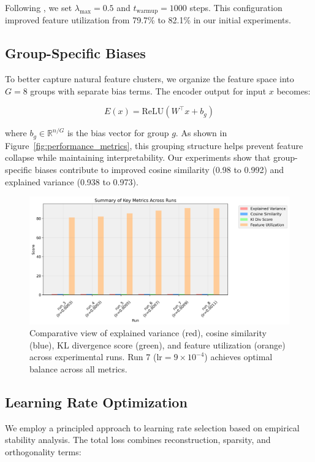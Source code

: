 \documentclass{article} %
\begin{document}
Following \cite{rajamanoharanJumpingAheadImproving2024}, we set $\lambda_{\text{max}}=0.5$ and $t_{\text{warmup}}=1000$ steps. This configuration improved feature utilization from 79.7\% to 82.1\% in our initial experiments.

\subsection{Group-Specific Biases}
To better capture natural feature clusters, we organize the feature space into $G=8$ groups with separate bias terms. The encoder output for input $x$ becomes:

\begin{equation}
    E(x) = \text{ReLU}(W^{\top}x + b_g)
\end{equation}

where $b_g \in \mathbb{R}^{n/G}$ is the bias vector for group $g$. As shown in Figure~\ref{fig:performance_metrics}, this grouping structure helps prevent feature collapse while maintaining interpretability. Our experiments show that group-specific biases contribute to improved cosine similarity (0.98 to 0.992) and explained variance (0.938 to 0.973).

\begin{figure}[t]
    \centering
    \includegraphics[width=\textwidth]{sae_metrics_summary.png}
    \caption{Comparative view of explained variance (red), cosine similarity (blue), KL divergence score (green), and feature utilization (orange) across experimental runs. Run 7 ($\text{lr}=9 \times 10^{-4}$) achieves optimal balance across all metrics.}
    \label{fig:metrics_summary}
\end{figure}

\subsection{Learning Rate Optimization}
We employ a principled approach to learning rate selection based on empirical stability analysis. The total loss combines reconstruction, sparsity, and orthogonality terms:
\end{document}
